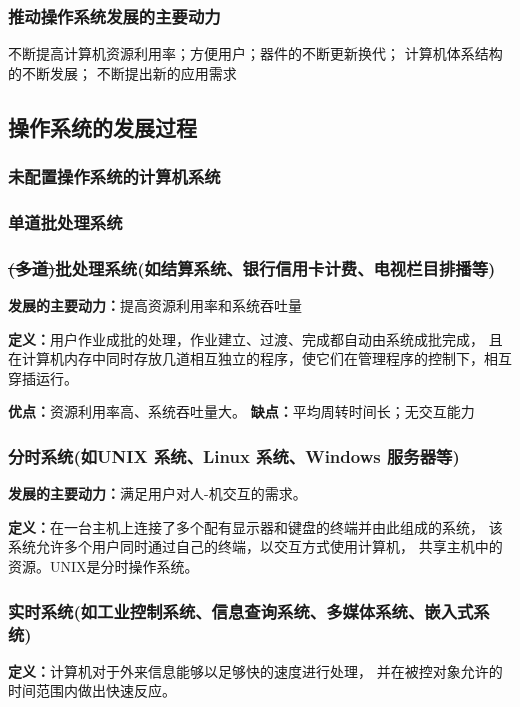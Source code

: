 \documentclass{article}
\begin{document}
\subsubsection{推动操作系统发展的主要动力}
不断提高计算机资源利用率；方便用户；器件的不断更新换代；
计算机体系结构的不断发展；
不断提出新的应用需求


\subsection{操作系统的发展过程}
\vspace*{-0.3cm}
\subsubsection{\color{gray}未配置操作系统的计算机系统}
\vspace*{-0.3cm}
\subsubsection{\color{gray}单道批处理系统}
\vspace*{-0.3cm}
\subsubsection{\color{red}\sout{(多道)}批处理系统(如结算系统、银行信用卡计费、电视栏目排播等)}
\textbf{发展的主要动力：}提高资源利用率和系统吞吐量

\textbf{定义：}用户作业成批的处理，作业建立、过渡、完成都自动由系统成批完成，
且在计算机内存中同时存放几道相互独立的程序，使它们在管理程序的控制下，相互穿插运行。

\textbf{优点：}资源利用率高、系统吞吐量大。
\textbf{缺点：}平均周转时间长；无交互能力


\subsubsection{\color{red}分时系统(如UNIX 系统、Linux 系统、Windows 服务器等)}
\textbf{发展的主要动力：}满足用户对人-机交互的需求。

\textbf{定义：}在一台主机上连接了多个配有显示器和键盘的终端并由此组成的系统，
该系统允许多个用户同时通过自己的终端，以交互方式使用计算机，
共享主机中的资源。UNIX是分时操作系统。

\subsubsection{\color{red}实时系统(如工业控制系统、信息查询系统、多媒体系统、嵌入式系统)}
\textbf{定义：}计算机对于外来信息能够以足够快的速度进行处理，
并在被控对象允许的时间范围内做出快速反应。
\end{document}

